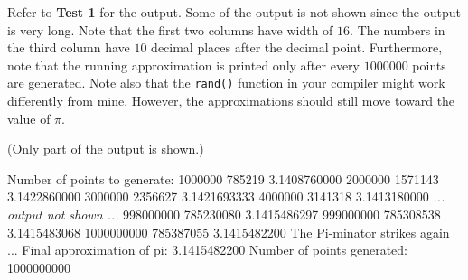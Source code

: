 Refer to \textbf{Test 1} for the output. Some of the output is not shown since
the output is very long. Note that the first two columns have width of $16$.
The numbers in the third column have $10$ decimal places after the decimal
point. Furthermore, note that the running approximation is printed only after
every $1000000$ points are generated. Note also that the \verb!rand()!
function in your compiler might work differently from mine. However, the
approximations should still move toward the value of $\pi$.


\resett
\nextt
(Only part of the output is shown.)
\begin{console}[frame=single, commandchars=\\\{\}]
Number of points to generate: 
1000000         785219          3.1408760000
2000000         1571143         3.1422860000
3000000         2356627         3.1421693333
4000000         3141318         3.1413180000
\emph{... output not shown ...}
998000000       785230080       3.1415486297
999000000       785308538       3.1415483068
1000000000      785387055       3.1415482200
The Pi-minator strikes again ...
Final approximation of pi: 3.1415482200
Number of points generated: 1000000000
\end{console}
